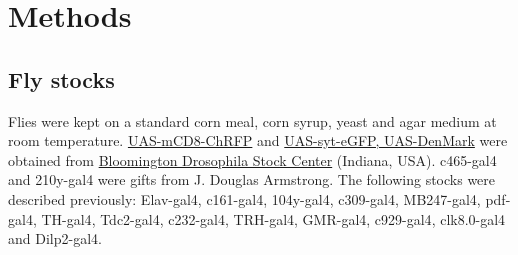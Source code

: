 \section*{Methods}

\subsection*{Fly stocks}

Flies were kept on a standard corn meal, corn syrup, yeast and agar medium at room temperature.
\href{http://flystocks.bio.indiana.edu/Reports/27392.html}{UAS-mCD8-ChRFP} and \href{http://flystocks.bio.indiana.edu/Reports/33065.html}{UAS-syt-eGFP, UAS-DenMark} were obtained from \href{http://flystocks.bio.indiana.edu}{Bloomington Drosophila Stock Center} (Indiana, USA).
c465-gal4 and 210y-gal4 were gifts from J. Douglas Armstrong.
The following stocks were described previously: Elav-gal4\cite{Lin:1994vn}, c161-gal4\cite{renn:1999aa}, 104y-gal4\cite{sakai:2006aa}, c309-gal4\cite{connolly:1996aa}, MB247-gal4\cite{zars:2000aa}, pdf-gal4\cite{renn:1999ab}, TH-gal4\cite{friggi-grelin:2003aa}, Tdc2-gal4\cite{alekseyenko:2010aa}, c232-gal4\cite{renn:1999aa}, TRH-gal4\cite{alekseyenko:2010aa}, GMR-gal4\cite{freeman:1996aa}, c929-gal4\cite{taghert:2001aa}, clk8.0-gal4\cite{glossop:2003aa} and Dilp2-gal4\cite{Rulifson:2002cg}.